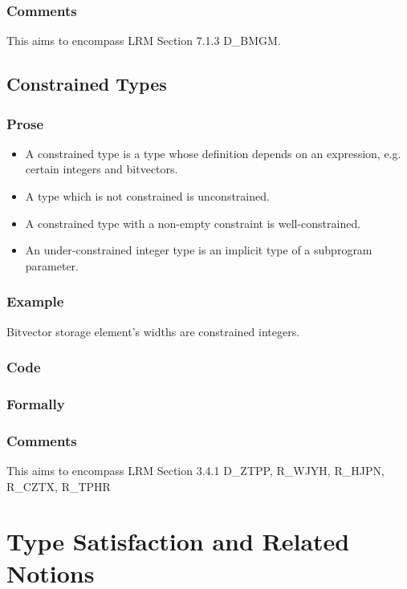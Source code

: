 \documentclass{book}
\begin{document}
  \subsection{Comments}
  This aims to encompass LRM Section 7.1.3 D\_BMGM.

\section{Constrained Types}

\subsection{Prose}
  \begin{itemize}
  \item A constrained type is a type whose definition depends on an expression, e.g. certain integers and bitvectors. 
  \item A type which is not constrained is unconstrained.
  \item A constrained type with a non-empty constraint is well-constrained.
  \item An under-constrained integer type is an implicit type of a subprogram parameter.
  \end{itemize}

  \subsection{Example}
    Bitvector storage element’s widths are constrained integers.  

  \subsection{Code}

\begin{emptyformal}
    \subsection{Formally}
\end{emptyformal}

\subsection{Comments}
    This aims to encompass LRM Section 3.4.1 D\_ZTPP, R\_WJYH, R\_HJPN, R\_CZTX, R\_TPHR

\chapter{Type Satisfaction and Related Notions}
\end{document}
